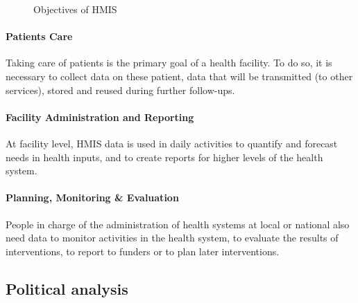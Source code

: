 \documentclass[a4paper,11pt,final,twoside]{article}
\begin{document}
\begin{figure}[htp]
\centering
{}
\caption{Objectives of HMIS}
\label{HMISGoals}
\end{figure}

\paragraph{Patients Care} Taking care of patients is the primary goal of a health facility. To do so, it is necessary to collect data on these patient, data that will be transmitted (to other services), stored and reused during further follow-ups. 

\paragraph{Facility Administration and Reporting} At facility level, HMIS data is used in daily activities to quantify and forecast needs in health inputs, and to create reports for higher levels of the health system. 

\paragraph{Planning, Monitoring \& Evaluation } People in charge of the administration of health systems at local or national also need data to monitor activities in the health system, to evaluate the results of interventions, to report to funders or to plan later interventions.

	\subsection{Political analysis}
\end{document}
